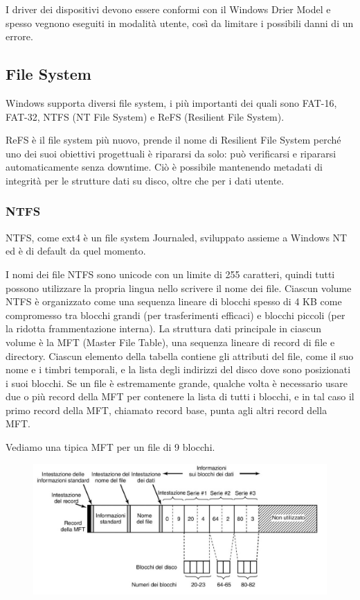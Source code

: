 I driver dei dispositivi devono essere conformi con il Windows Drier Model e spesso vegnono eseguiti in modalità utente, così da limitare i possibili danni di un errore.

\subsection{File System}
Windows supporta diversi file system, i più importanti dei quali sono FAT-16, FAT-32, NTFS (NT File System) e ReFS (Resilient File System).

ReFS è il file system più nuovo, prende il nome di Resilient File System perché uno dei suoi obiettivi progettuali è ripararsi da solo: può verificarsi e ripararsi automaticamente senza downtime.
Ciò è possibile mantenendo metadati di integrità per le strutture dati su disco, oltre che per i dati utente.

\subsubsection{NTFS}
NTFS, come ext4 è un file system Journaled, sviluppato assieme a Windows NT ed è di default da quel momento.

\spacer
I nomi dei file NTFS sono unicode con un limite di 255 caratteri, quindi tutti possono utilizzare la propria lingua nello scrivere il nome dei file.
\spacer
Ciascun volume NTFS è organizzato come una sequenza lineare di blocchi spesso di 4 KB come compromesso tra blocchi grandi (per trasferimenti efficaci) e blocchi piccoli (per la ridotta frammentazione interna).
\spacer
La struttura dati principale in ciascun volume è la MFT (Master File Table), una sequenza lineare di record di file e directory.
Ciascun elemento della tabella contiene gli attributi del file, come il suo nome e i timbri temporali, e la lista degli indirizzi del disco dove sono posizionati i suoi blocchi. Se un file è estremamente grande, qualche volta è necessario usare due o più record della MFT per contenere la lista di tutti i blocchi, e in tal caso il primo record della MFT, chiamato record base, punta agli altri record della MFT.

\spacer
Vediamo una tipica MFT per un file di 9 blocchi.
\begin{figure}[H]
    \centering
    \includegraphics[width=0.75\linewidth]{assets/Windows-MFT.jpeg}
\end{figure}

